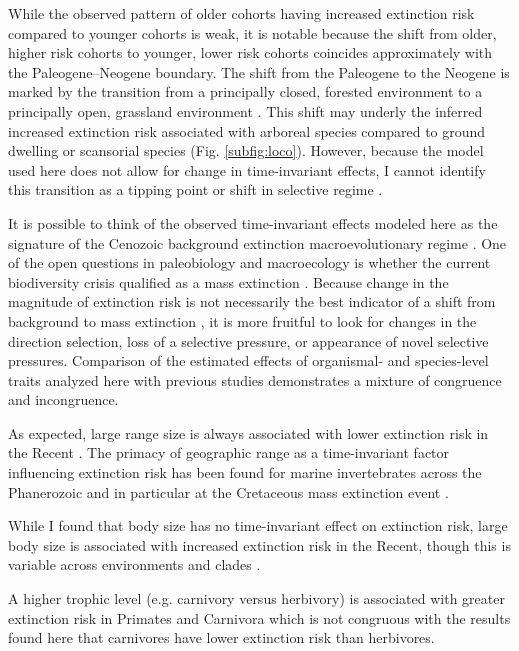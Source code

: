 \documentclass[12pt,letterpaper]{article}
\begin{document}
While the observed pattern of older cohorts having increased extinction risk compared to younger cohorts is weak, it is notable because the shift from older, higher risk cohorts to younger, lower risk cohorts coincides approximately with the Paleogene--Neogene boundary. The shift from the Paleogene to the Neogene is marked by the transition from a principally closed, forested environment to a principally open, grassland environment \citep{Stromberg2005,Janis1993a,Janis2000}. This shift may underly the inferred increased extinction risk associated with arboreal species compared to ground dwelling or scansorial species (Fig. \ref{subfig:loco}). However, because the model used here does not allow for change in time-invariant effects, I cannot identify this transition as a tipping point or shift in selective regime \citep{Barnosky2012a,Barnosky2011}.

It is possible to think of the observed time-invariant effects modeled here as the signature of the Cenozoic background extinction macroevolutionary regime \citep{Jablonski1986}. One of the open questions in paleobiology and macroecology is whether the current biodiversity crisis qualified as a mass extinction \citep{Alroy2010,Barnosky2011,Barnosky2012a}. Because change in the magnitude of extinction risk is not necessarily the best indicator of a shift from background to mass extinction \citep{Wang2003}, it is more fruitful to look for changes in the direction selection, loss of a selective pressure, or appearance of novel selective pressures. Comparison of the estimated effects of organismal- and species-level traits analyzed here with previous studies demonstrates a mixture of congruence and incongruence. 

As expected, large range size is always associated with lower extinction risk in the Recent \citep{Fritz2009,Fritz2010b,Liow2009,Purvis2000a}. The primacy of geographic range as a time-invariant factor influencing extinction risk has been found for marine invertebrates across the Phanerozoic and in particular at the Cretaceous mass extinction event \citep{Jablonski1986,Payne2007}.

While I found that body size has no time-invariant effect on extinction risk, large body size is associated with increased extinction risk in the Recent, though this is variable across environments and clades \citep{Liow2009,Fritz2009,Purvis2000a}. 

A higher trophic level (e.g. carnivory versus herbivory) is associated with greater extinction risk in Primates and Carnivora \citep{Purvis2000a} which is not congruous with the results found here that carnivores have lower extinction risk than herbivores. 
\end{document}
